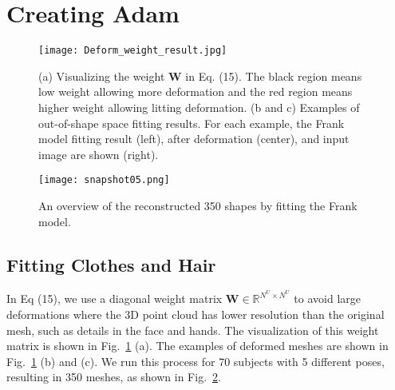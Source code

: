 \documentclass[11pt,english]{article}
\begin{document}
\section{Creating Adam}

\begin{figure}[t]
    \centering
    \texttt{[image: Deform\_weight\_result.jpg]}
    \caption{ (a) Visualizing the weight $\mathbf{W}$ in Eq. (15). The black region means low weight allowing more deformation and the red region means higher weight allowing litting deformation. (b and c) Examples of out-of-shape space fitting results. For each example, the Frank model fitting result (left), after deformation (center), and input image are shown (right).}
    \label{fig:deformation}
\end{figure}



\begin{figure}[t]
    \centering
    \texttt{[image: snapshot05.png]}
    \caption{ An overview of the reconstructed 350 shapes by fitting the Frank model.}
    \label{fig:frank_350}
\end{figure}

\subsection{Fitting Clothes and Hair}

In Eq (15), we use a diagonal weight matrix $\mathbf{W}\in\mathds{R}^{N^U\times N^U}$ to avoid large deformations where the 3D point cloud has lower resolution than the original mesh, such as details in the face and hands. The visualization of this weight matrix is shown in Fig.~\ref{fig:deformation} (a). The examples of deformed meshes are shown in Fig.~\ref{fig:deformation} (b) and (c). We run this process for 70 subjects with 5 different poses, resulting in 350 meshes, as shown in Fig.~\ref{fig:frank_350}.


\end{document}
